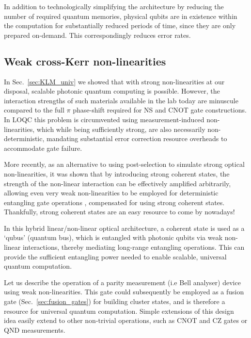 In addition to technologically simplifying the architecture by reducing the number of required quantum memories, physical qubits are in existence within the computation for substantially reduced periods of time, since they are only prepared on-demand. This correspondingly reduces error rates.

%
%

\subsection{Weak cross-Kerr non-linearities} 

In Sec.~\ref{sec:KLM_univ} we showed that with strong non-linearities at our disposal, scalable photonic quantum computing is possible. However, the interaction strengths of such materials available in the lab today are minuscule compared to the full $\pi$ phase-shift required for NS and CNOT gate constructions. In LOQC this problem is circumvented using measurement-induced non-linearities, which while being sufficiently strong, are also necessarily non-deterministic, mandating substantial error correction resource overheads to accommodate gate failure.

More recently, as an alternative to using post-selection to simulate strong optical non-linearities, it was shown that by introducing strong coherent states, the strength of the non-linear interaction can be effectively amplified arbitrarily, allowing even very weak non-linearities to be employed for deterministic entangling gate operations \cite{bib:Munro05}, compensated for using strong coherent states. Thankfully, strong coherent states are an easy resource to come by nowadays!

In this hybrid linear/non-linear optical architecture, a coherent state is used as a `qubus' (quantum bus), which is entangled with photonic qubits via weak non-linear interactions, thereby mediating long-range entangling operations. This can provide the sufficient entangling power needed to enable scalable, universal quantum computation.

Let us describe the operation of a parity measurement (i.e Bell analyser) device using weak non-linearities. This gate could subsequently be employed as a fusion gate (Sec.~\ref{sec:fusion_gates}) for building cluster states, and is therefore a resource for universal quantum computation. Simple extensions of this design idea easily extend to other non-trivial operations, such as CNOT and CZ gates or QND measurements. 

